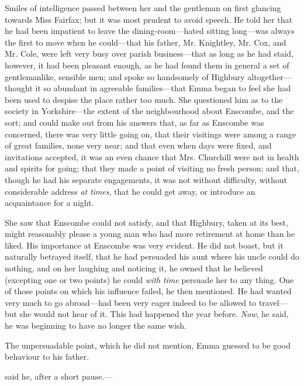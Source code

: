 Smiles of intelligence passed between her and the gentleman on first glancing towards Miss Fairfax; but it was most prudent to avoid speech. He told her that he had been impatient to leave the dining-room---hated sitting long---was always the first to move when he could---that his father, Mr. Knightley, Mr. Cox, and Mr. Cole, were left very busy over parish business---that as long as he had staid, however, it had been pleasant enough, as he had found them in general a set of gentlemanlike, sensible men; and spoke so handsomely of Highbury altogether---thought it so abundant in agreeable families---that Emma began to feel she had been used to despise the place rather too much. She questioned him as to the society in Yorkshire---the extent of the neighbourhood about Enscombe, and the sort; and could make out from his answers that, as far as Enscombe was concerned, there was very little going on, that their visitings were among a range of great families, none very near; and that even when days were fixed, and invitations accepted, it was an even chance that Mrs. Churchill were not in health and spirits for going; that they made a point of visiting no fresh person; and that, though he had his separate engagements, it was not without difficulty, without considerable address {\em at} {\em times}, that he could get away, or introduce an acquaintance for a night.

She saw that Enscombe could not satisfy, and that Highbury, taken at its best, might reasonably please a young man who had more retirement at home than he liked. His importance at Enscombe was very evident. He did not boast, but it naturally betrayed itself, that he had persuaded his aunt where his uncle could do nothing, and on her laughing and noticing it, he owned that he believed (excepting one or two points) he could {\em with} {\em time} persuade her to any thing. One of those points on which his influence failed, he then mentioned. He had wanted very much to go abroad---had been very eager indeed to be allowed to travel---but she would not hear of it. This had happened the year before. {\em Now}, he said, he was beginning to have no longer the same wish.

The unpersuadable point, which he did not mention, Emma guessed to be good behaviour to his father.

 said he, after a short pause.--- 


